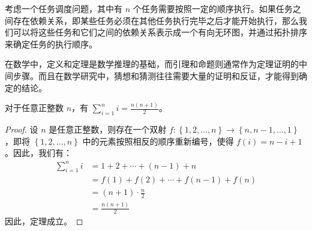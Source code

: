\begin{exmp}
  考虑一个任务调度问题，其中有 $n$ 个任务需要按照一定的顺序执行。如果任务之间存在依赖关系，即某些任务必须在其他任务执行完毕之后才能开始执行，那么我们可以将这些任务和它们之间的依赖关系表示成一个有向无环图，并通过拓扑排序来确定任务的执行顺序。
\end{exmp}

\begin{rem}
  在数学中，定义和定理是数学推理的基础，而引理和命题则通常作为定理证明的中间步骤。而且在数学研究中，猜想和猜测往往需要大量的证明和反证，才能得到确定的结论。
\end{rem}

\begin{thm}
  对于任意正整数 $n$，有 $\displaystyle\sum_{i=1}^n i = \frac{n(n+1)}{2}$。
\end{thm}

\begin{proof}
  设 $n$ 是任意正整数，则存在一个双射 $f: \left\{1,2,\dots,n\right\} \rightarrow \left\{n,n-1,\dots,1\right\}$，即将 $\left\{1,2,\dots,n\right\}$ 中的元素按照相反的顺序重新编号，使得 $f(i) = n-i+1$。因此，我们有：
  \begin{align*}
    \sum_{i=1}^n i & = 1 + 2 + \cdots + (n-1) + n           \\
                   & = f(1) + f(2) + \cdots + f(n-1) + f(n) \\
                   & = (n+1) \cdot \frac{n}{2}              \\
                   & = \frac{n(n+1)}{2}
  \end{align*}
  因此，定理成立。
\end{proof}
